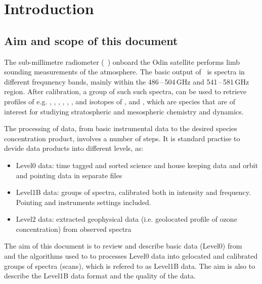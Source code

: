 \chapter{Introduction}
\label{chapter:introduction}

\setcounter{page}{1}


\section{Aim and scope of this document}
\label{sec:aim}

The sub-millimetre radiometer (\SMR\ ) onboard the Odin satellite
performs limb sounding measurements of the atmosphere.
The basic output of \smr\ is spectra in different frequnency
bands, mainly within the 486\,--\,504\,GHz and 541\,--\,581\,GHz region.
After calibration, a group of such such spectra, can be used
to retrieve profiles of e.g. , , , , 
, , and isotopes of , and ,
which are species that are of interest for studiying stratospheric and 
mesospheric chemistry and dynamics. 

The processing of data, from basic instrumental data to the
desired species concentration product, involves a number of steps.
It is standard practise to devide data products into different levels, as:

\begin{itemize}

\item Level0 data: time tagged and sorted science and house keeping data
and orbit and pointing data in separate files

\item Level1B data: groups of spectra, calibrated both in intensity and frequency. 
Pointing and instruments settings included.

\item Level2 data: extracted geophysical data (i.e. geolocated profile
of ozone concentration) from observed spectra

\end{itemize}


The aim of this document is to review and describe basic
data (Level0) from \smr\, and the algorithms used to 
to processes Level0 data into gelocated and calibrated 
groups of spectra (scans), which is refered to as Level1B data. 
The aim is also to describe the Level1B data format and 
the quality of the data.


